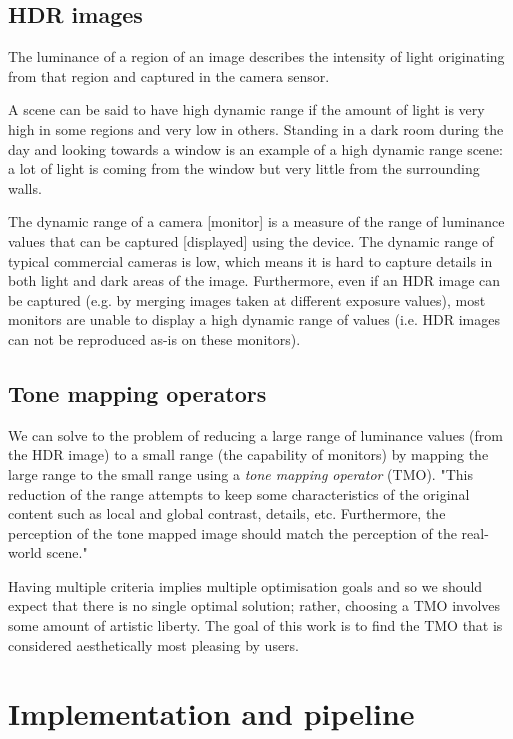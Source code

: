 \documentclass[a4paper]{scrartcl}
\begin{document}
\subsection{HDR images}

The luminance of a region of an image describes the intensity of light originating from that region and captured in the camera sensor.

A scene can be said to have high dynamic range if the amount of light is very high in some regions and very low in others. Standing in a dark room during the day and looking towards a window is an example of a high dynamic range scene: a lot of light is coming from the window but very little from the surrounding walls.

The dynamic range of a camera [monitor] is a measure of the range of luminance values that can be captured [displayed] using the device. The dynamic range of typical commercial cameras is low, which means it is hard to capture details in both light and dark areas of the image. Furthermore, even if an HDR image can be captured (e.g. by merging images taken at different exposure values), most monitors are unable to display a high dynamic range of values (i.e. HDR images can not be reproduced as-is on these monitors).

\subsection{Tone mapping operators}

We can solve to the problem of reducing a large range of luminance values (from the HDR image) to a small range (the capability of monitors) by mapping the large range to the small range using a \emph{tone mapping operator} (TMO). "This reduction of the range attempts to keep some characteristics of the original content such as local and global contrast, details, etc. Furthermore, the perception of the tone mapped image should match the perception of the real-world scene." \cite{Banterle:2011}

Having multiple criteria implies multiple optimisation goals and so we should expect that there is no single optimal solution; rather, choosing a TMO involves some amount of artistic liberty. The goal of this work is to find the TMO that is considered aesthetically most pleasing by users.

\section{Implementation and pipeline}
\label{sec:implementation}
\end{document}
